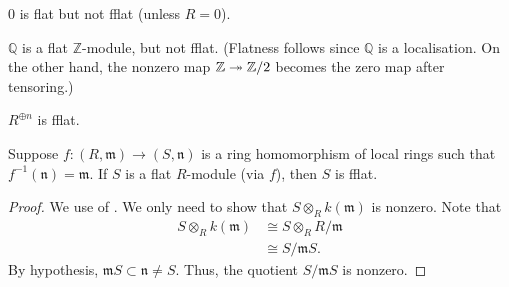 \documentclass[12pt]{article}
\begin{document}
\begin{ex}
	$0$ is flat but not fflat (unless $R = 0$).

	$\mathbb{Q}$ is a flat $\mathbb{Z}$-module, but not fflat. (Flatness follows since $\mathbb{Q}$ is a localisation. On the other hand, the nonzero map $\mathbb{Z} \twoheadrightarrow \mathbb{Z}/2$ becomes the zero map after tensoring.)

	$R^{\oplus n}$ is fflat.
\end{ex}

\begin{lem} 
	Suppose $f : (R, \mathfrak{m}) \to (S, \mathfrak{n})$ is a ring homomorphism of local rings such that $f^{-1}(\mathfrak{n}) = \mathfrak{m}$. \newline
	If $S$ is a flat $R$-module (via $f$), then $S$ is fflat.
\end{lem}
\begin{proof} 
	We use  of . We only need to show that $S \otimes_{R} k(\mathfrak{m})$ is nonzero. Note that
	\begin{align*} 
		S \otimes_{R} k(\mathfrak{m}) &\cong S \otimes_{R} R/\mathfrak{m} \\
		&\cong S/\mathfrak{m}S.
	\end{align*}
	By hypothesis, $\mathfrak{m} S \subset \mathfrak{n} \neq S$. Thus, the quotient $S/\mathfrak{m} S$ is nonzero.
\end{proof}
\end{document}
